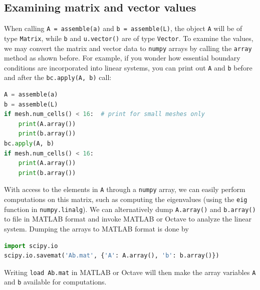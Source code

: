 \documentclass[graybox,envcountchap,sectrefs,final]{svmonodo}
\begin{document}

\subsection{Examining matrix and vector values}

When calling \texttt{A = assemble(a)} and \texttt{b = assemble(L)}, the object \texttt{A}
will be of type \texttt{Matrix}, while \texttt{b} and \texttt{u.vector()} are of type
\texttt{Vector}. To examine the values, we may convert the matrix and vector
data to \texttt{numpy} arrays by calling the \texttt{array} method as shown
before. For example, if you wonder how essential boundary conditions are
incorporated into linear systems, you can print out \texttt{A} and \texttt{b}
before and after the \texttt{bc.apply(A, b)} call:

\begin{lstlisting}[language=Python,style=graycolor]
A = assemble(a)
b = assemble(L)
if mesh.num_cells() < 16:  # print for small meshes only
    print(A.array())
    print(b.array())
bc.apply(A, b)
if mesh.num_cells() < 16:
    print(A.array())
    print(b.array())
\end{lstlisting}

With access to the elements in \texttt{A} through a \texttt{numpy} array, we can easily
perform computations on this matrix, such as computing the eigenvalues
(using the \texttt{eig} function in \texttt{numpy.linalg}). We can alternatively dump
\texttt{A.array()} and \texttt{b.array()} to file in MATLAB format and invoke
MATLAB or Octave to analyze the linear system.
Dumping the arrays to MATLAB format is done by


\begin{lstlisting}[language=Python,style=graycolor]
import scipy.io
scipy.io.savemat('Ab.mat', {'A': A.array(), 'b': b.array()})
\end{lstlisting}
Writing \texttt{load Ab.mat} in MATLAB or Octave will then make
the array variables \texttt{A} and \texttt{b} available for computations.
\end{document}

